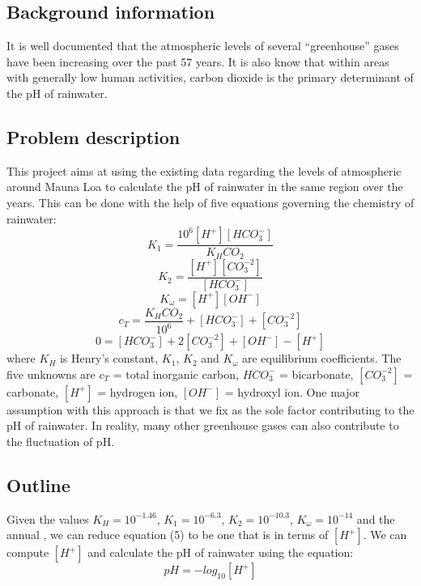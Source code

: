 \documentclass[openany]{book}
\begin{document}
	\subsection{Background information}
	It is well documented that the atmospheric levels of several “greenhouse” gases have been increasing over the past 57 years. It is also know that within areas with generally low human activities, carbon dioxide is the primary determinant of the pH of rainwater.
	
	\subsection{Problem description}
	This project aims at using the existing data regarding the levels of atmospheric  around Mauna Loa to calculate the pH of rainwater in the same region over the years. This can be done with the help of five equations governing the chemistry of rainwater:
	\[ K_1 = \frac{10^6[H^+][HCO_3^-]}{K_HCO_2} \tag{1} \]
	\[ K_2 = \frac{[H^+][CO_3^{-2}]}{[HCO_3^-]} \tag{2} \]
	\[ K_\omega = [H^+][OH^-] \tag{3} \]
	\[ c_T = \frac{K_HCO_2}{10^6} + [HCO_3^-] + [CO_3^{-2}] \tag{4} \]
	\[ 0 = [HCO_3^-] + 2[CO_3^{-2}] + [OH^-] - [H^+] \tag{5} \]
	where ${K_H}$ is Henry's constant, ${K_1}$, ${K_2}$ and ${K_\omega}$ are equilibrium coefficients. The five unknowns are ${c_T}$ = total inorganic carbon, ${HCO_3^-}$ = bicarbonate, ${[CO_3^{-2}]}$ = carbonate, ${[H^+]}$ = hydrogen ion, ${[OH^-]}$ = hydroxyl ion.
	One major assumption with this approach is that we fix  as the sole factor contributing to the pH of rainwater. In reality, many other greenhouse gases can also contribute to the fluctuation of pH.

	\subsection{Outline}
	Given the values ${K_H  = 10^{-1.46}}$, ${ K_1 =  10^{-6.3}}$, ${ K_2 = 10^{-10.3}}$, ${ K_\omega = 10^{-14}}$ and the annual , we can reduce equation (5) to be one that is in terms of ${[H^+]}$. We can compute ${[H^+]}$ and calculate the pH of rainwater using the equation:
	\[ pH = -log_{10}[H^+] \tag{6} \]
	
\end{document}
